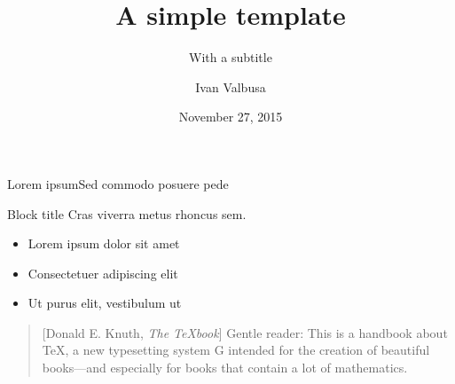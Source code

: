 \documentclass{beamer}
\title{A simple template}
\subtitle{With a subtitle}
\author[Ivan Valbusa]{Ivan Valbusa}
\institute[University of Verona]{Department of Philology, Literature, and Linguistics\\
University of Verona}
\date{November 27, 2015}
\begin{document}
\maketitle
\begin{frame}{Lorem ipsum}{Sed commodo posuere pede}

%

    \begin{block}{Block title}
    Cras viverra metus rhoncus sem.
    \end{block}
    
    \begin{itemize}
    	\item Lorem ipsum dolor sit amet
    	\item Consectetuer adipiscing elit
    	\item Ut purus elit, vestibulum ut
    \end{itemize}

\begin{quotation}[Donald E. Knuth, \emph{The \TeX book}]
Gentle reader: This is a handbook about \TeX, a new typesetting system G intended for the creation of beautiful books—and especially for books that contain a lot of mathematics.
\end{quotation}

\end{frame}

\end{document}
